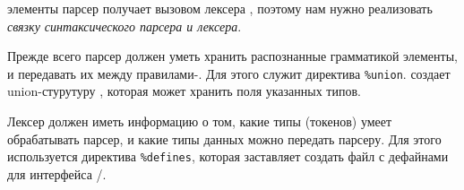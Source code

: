 
 элементы парсер получает вызовом лексера ,
поэтому нам нужно реализовать \emph{связку синтаксического парсера и лексера}.

Прежде всего парсер должен уметь хранить распознанные грамматикой элементы, и
передавать их между правилами-. Для этого служит директива
\verb|%union|.  создает union-стурутуру , которая
может хранить поля указанных типов.

Лексер должен иметь информацию о том, какие типы  (токенов)
умеет обрабатывать парсер, и какие типы данных можно передать парсеру. Для
этого используется директива \verb|%defines|, которая заставляет 
создать файл  с дефайнами для интерфейса
/.


